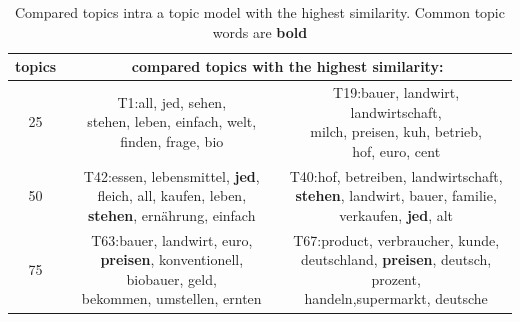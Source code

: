 \begin{table}
	\centering
	\begin{tabular}{c|c|c}
		topics& \multicolumn{2}{c}{compared topics with the highest similarity:}\\
		\hline
		25 & T1:\thead{all, jed, sehen,\\ stehen, leben, einfach, welt,\\finden, frage, bio}&T19:\thead{bauer, landwirt, landwirtschaft,\\ milch, preisen, kuh, betrieb,\\ hof, euro, cent}\\
		\hline
		50 &T42:\thead{essen, lebensmittel, \textbf{jed},\\ fleich, all, kaufen, leben,\\ \textbf{stehen}, ernährung, einfach}&T40:\thead{hof, betreiben, landwirtschaft,\\ \textbf{stehen}, landwirt, bauer, familie,\\ verkaufen, \textbf{jed}, alt}\\
		\hline
		75&T63:\thead{bauer, landwirt, euro,\\ \textbf{preisen}, konventionell, biobauer, geld, \\bekommen, umstellen, ernten}&T67:\thead{product, verbraucher, kunde,\\ deutschland, \textbf{preisen}, deutsch, prozent,\\ handeln,supermarkt, deutsche}
	\end{tabular}
	\caption[]{Compared topics intra a topic model with the highest similarity. Common topic words are \textbf{bold}}
	\label{intra_topic}
\end{table}

